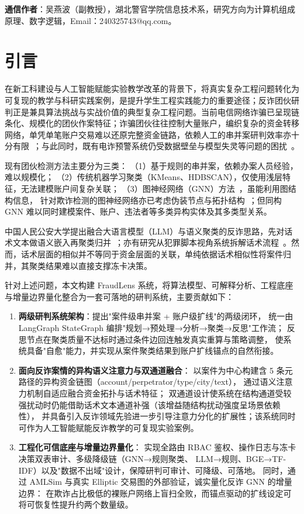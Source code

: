 \documentclass[12pt,a4paper]{ctexart}
\begin{document}
\noindent\textbf{通信作者}：吴燕波（副教授），湖北警官学院信息技术系，研究方向为计算机组成原理、数字逻辑，Email：240325743@qq.com。

\section{引言}

在新工科建设与人工智能赋能实验教学改革的背景下，将真实复杂工程问题转化为可复现的教学与科研实践案例，是提升学生工程实践能力的重要途径；反诈团伙研判正是兼具算法挑战与实战价值的典型复杂工程问题。当前电信网络诈骗已呈现链条化、规模化的团伙作案特征；诈骗团伙往往控制大量账户，编织复杂的资金转移网络，单凭单笔账户交易难以还原完整资金链路，依赖人工的串并案研判效率亦十分有限~\cite{wu2023moneylaunder}；与此同时，既有电诈预警系统仍受数据壁垒与模型失灵等问题的困扰~\cite{zhuang2025warning}。

现有团伙检测方法主要分为三类：
（1）基于规则的串并案，依赖办案人员经验，难以规模化；
（2）传统机器学习聚类（KMeans、HDBSCAN），仅使用浅层特征，无法建模账户间复杂关联；
（3）图神经网络（GNN）方法~\cite{kipf2017gcn,hamilton2017graphsage,zhang2024ciesgnn}，虽能利用图结构信息，
针对欺诈检测的图神经网络亦已考虑伪装节点与拓扑结构~\cite{dou2020caregnn}；但同构 GNN 难以同时建模案件、账户、违法者等多类异构实体及其多类型关系。

中国人民公安大学提出融合大语言模型（LLM）与语义聚类的反诈思路，先对话术文本做语义嵌入再聚类归并~\cite{shi2025llmsemantic}；亦有研究从犯罪脚本视角系统拆解话术流程~\cite{yang2025crimescript}。然而，话术层面的相似并不等同于资金层面的关联，单纯依据话术相似性将案件归并，其聚类结果难以直接支撑冻卡决策。

针对上述问题，本文构建 FraudLens 系统，将算法模型、可解释分析、工程底座与增量边界量化整合为一套可落地的研判系统，主要贡献如下：
\begin{enumerate}
  \item \textbf{两级研判系统架构}：提出"案件级串并案 + 账户级扩线"的两级闭环，
    统一由 LangGraph StateGraph 编排"规划→预处理→分析→聚类→反思"工作流；
    反思节点在聚类质量不达标时通过条件边回连触发真实重算与策略调整，
    使系统具备"自愈"能力，并实现从案件聚类结果到账户扩线锚点的自然衔接。
  \item \textbf{面向反诈案情的异构语义注意力与双通道融合}：
    以案件为中心构建含 5 条元路径的异构资金链图（account/perpetrator/type/city/text），
    通过语义注意力机制自适应融合资金拓扑与话术特征；
    双通道设计使系统在结构通道受较强扰动时仍能借助话术文本通道补强（该增益随结构扰动强度呈场景依赖性），
    并具备引入反诈领域先验进一步引导注意力分化的扩展性；该系统同时可作为人工智能赋能反诈教学的可复现实验案例。
  \item \textbf{工程化可信底座与增量边界量化}：
    实现全路由 RBAC 鉴权、操作日志与冻卡决策双表审计、多级降级链（GNN→规则聚类、
    LLM→规则、BGE→TF-IDF）以及"数据不出域"设计，保障研判可审计、可降级、可落地。
    同时，通过 AMLSim 与真实 Elliptic 交易图的外部验证，诚实量化反诈 GNN 的增量边界：
    在欺诈占比极低的裸账户网络上盲扫全败，而锚点驱动的扩线设定可将可恢复性提升约两个数量级。
\end{enumerate}
\end{document}
